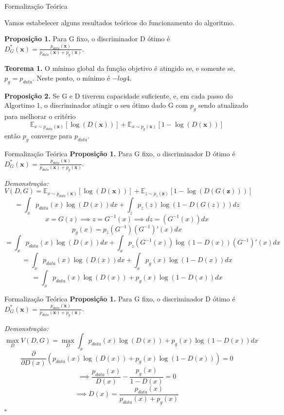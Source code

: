 \documentclass[10pt]{beamer}
\newcommand*{\QEDB}{\hfill\ensuremath{\square}}%
\begin{document}
\begin{frame}[fragile]{Formalização Teórica}
	
	Vamos estabelecer alguns resultados teóricos do funcionamento
	do algoritmo.

	\small
	\textbf{Proposição 1.} Para G fixo, o discriminador D ótimo é
	$
	D^*_G(\bm x) = \frac{p_{data}(\bm x)}
	{p_{data}(\bm x) + p_g(\bm x)}
	$.

	\hfill
	\break
	\textbf{Teorema 1.} O mínimo global da função objetivo
	é atingido se, e somente se, $p_g = p_{data}$. Neste ponto,
	o mínimo é $-log 4$.

	\hfill
	\break
	\textbf{Proposição 2.} Se G e D tiverem capacidade suficiente,
	e, em cada passo do Algortimo 1, o discriminador atingir o seu
	ótimo dado G com $p_g$ sendo atualizado para melhorar o critério
    $$
    \mathbb{E}_{x\sim p_{data}(\bm x)}\left[\log{(D(\bm x))}\right]+
    \mathbb{E}_{x\sim p_g(\bm x)}\left[1-\log{(D(\bm x))}\right]
    $$
    então $p_g$ converge para $p_{data}$.

\end{frame}

\begin{frame}[fragile]{Formalização Teórica}
\small
	\textbf{Proposição 1.} Para G fixo, o discriminador D ótimo é
	$
	D^*_G(\bm x) = \frac{p_{data}(\bm x)}
	{p_{data}(\bm x) + p_g(\bm x)}
	$.

	\textit{Demonstração:}
  $$V(D,G)=
    \mathbb{E}_{x\sim p_{data}(\bm x)}\left[\log{(D(\bm x))}\right]+
    \mathbb{E}_{z\sim p_z(\bm z)}\left[1-\log{(D(G(\bm z)))}\right]
  $$
  \pause
  $$= \int_x p_{data}(x)\log{(D(x))}dx + \int_z p_z(z)\log{(1-D(G(z)))}dz $$
  \pause
  $$x = G(z) \implies z = G^{-1}(x) \implies dz = (G^{-1}(x))dx $$
  $$p_g(x) = p_z(G^{-1})(G^{-1})'(x)dx $$
  \pause
  $$= \int_x p_{data}(x)\log{(D(x))}dx + \int_x p_z(G^{-1}(x))\log{(1-D(x))}(G^{-1})'(x)dx $$
  \pause
  $$= \int_x p_{data}(x)\log{(D(x))}dx + \int_x p_g(x)\log{(1-D(x))}dx $$
  \pause
  $$= \int_x p_{data}(x)\log{(D(x))} + p_g(x)\log{(1-D(x))}dx $$
\end{frame}

\begin{frame}[fragile]{Formalização Teórica}
\small
	\textbf{Proposição 1.} Para G fixo, o discriminador D ótimo é
	$
	D^*_G(\bm x) = \frac{p_{data}(\bm x)}
	{p_{data}(\bm x) + p_g(\bm x)}
	$.

	\textit{Demonstração:}
 $$\max_{D} V(D,G) = \max_{D}\int_x p_{data}(x)\log{(D(x))} + p_g(x)\log{(1-D(x))}dx $$
 \pause
 $$\frac{\partial}{\partial D(x)} \left(p_{data}(x)\log{(D(x))} + p_g(x)\log{(1-D(x))}\right) = 0 $$
 \pause
 $$\implies \dfrac{p_{data}(x)}{D(x)} - \dfrac{p_g(x)}{1 - D(x)} = 0 $$
 $$\implies D(x) = \dfrac{p_{data}(x)}{p_{data}(x)+p_g(x)} $$
 \QEDB
\end{frame}
\end{document}
